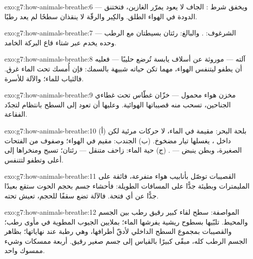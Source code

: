 \begin{solution}{exo:g7:how-animals-breathe:6}
 --- ويخفق شرط :  الجاف لا يعود يمرّر
الغازين، فتختنق الدودة في الهواء الطلق. والكِبر والرقّة لا ينقذان
سطحًا لم يعد رطبًا.
\end{solution}

\begin{solution}{exo:g7:how-animals-breathe:7}
الشرغوف: . والبالغ: رئتان بسيطتان مع  الرطب --- 
وحده يخدم عبر شتاء قاع البركة الخامد.
\end{solution}

\begin{solution}{exo:g7:how-animals-breathe:8}
آلته  --- موروثة عن أسلاف يابسة تُرضع حليبًا --- فعليه أن
يطفو ليتنفس الهواء، مهما تكن حياته شبيهة بالسمك: فإن أُمسك تحت
الماء غرق. فالثياب للماء؛ والآلة للأسرة.
\end{solution}

\begin{solution}{exo:g7:how-animals-breathe:9}
مخزن هواء محمول --- خزّان غطّاس تحت غطاءي الجناحين، تسحب منه
قصيباتها الهوائية. وعليها أن تعود إلى السطح بانتظام لتجدّد
الفقاعة.
\end{solution}

\begin{solution}{exo:g7:how-animals-breathe:10}
(أ) بلحة البحر: مقيمة في الماء، لا حركات مرئية لكن  داخل
، يغسلها تيار مضخوخ. (ب) الجندب: مقيم في الهواء؛ وصفوف من
الفتحات الصغيرة، وبطن ينبض --- . (ج) حية الماء: زاحف
متنقل --- رئتان؛ تسبح ومنخراها إلى أعلى وتطفو لتتنفس.
\end{solution}

\begin{solution}{exo:g7:how-animals-breathe:11}
القصيبات توصّل بأنابيب هواء متفرعة، فائقة على المليمترات وبطيئة
جدًّا على المسافات الطويلة: فأحشاء جسم بحجم الحوت ستقع بعيدًا جدًّا
عن أي فتحة. فالآلة تضع سقفًا للحجم،  تعيش تحته.
\end{solution}

\begin{solution}{exo:g7:how-animals-breathe:12}
المواصفة: سطح لقاء كبير رقيق رطب بين الجسم والمحيط. 
تلبّيها بسطوح ريشية يفرشها الماء؛  بملايين الجيوب المطوية
في مأوى رطب؛ والقصيبات بمجموع السطح الداخلي لأدقّ أطرافها، وهي
رطبة عند نهاياتها؛  بظاهر الجسم الرطب كله، مبقًى كبيرًا
بالقياس إلى جسم صغير رقيق. أربعة ممسكات وشيء ممسوك واحد.
\end{solution}

